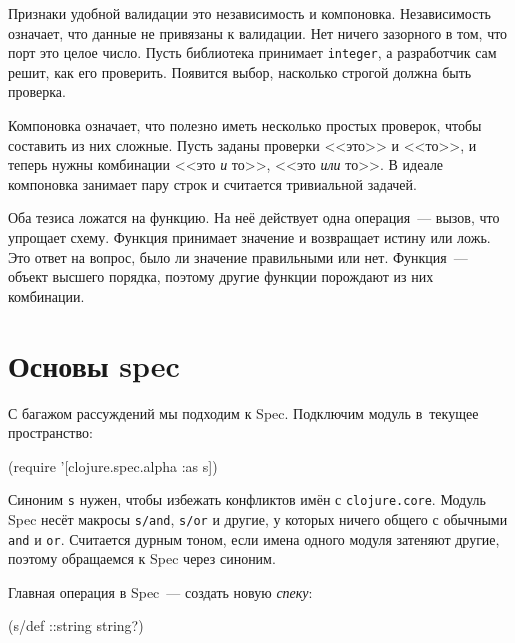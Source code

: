 
Признаки удобной валидации это независимость и компоновка. Независимость
означает, что данные не привязаны к валидации. Нет ничего зазорного в том, что
порт это целое число. Пусть библиотека принимает \verb|integer|, а разработчик
сам решит, как его проверить. Появится выбор, насколько строгой должна быть
проверка.


Компоновка означает, что полезно иметь несколько простых проверок, чтобы
составить из них сложные. Пусть заданы проверки <<это>> и <<то>>, и теперь нужны
комбинации <<это \emph{и} то>>, <<это \emph{или} то>>. В идеале компоновка
занимает пару строк и считается тривиальной задачей.


Оба тезиса ложатся на функцию. На неё действует одна операция~--- вызов, что
упрощает схему. Функция принимает значение и возвращает истину или ложь. Это
ответ на вопрос, было ли значение правильными или нет. Функция~--- объект
высшего порядка, поэтому другие функции порождают из них комбинации.

\section{Основы spec}

С багажом рассуждений мы подходим к Spec. Подключим модуль в~текущее
пространство:

\begin{english}
  \begin{clojure}
(require '[clojure.spec.alpha :as s])
  \end{clojure}
\end{english}

Синоним \verb|s| нужен, чтобы избежать конфликтов имён с
\verb|clojure.core|. Модуль Spec несёт макросы \verb|s/and|, \verb|s/or| и
другие, у которых ничего общего с обычными \verb|and| и \verb|or|. Считается
дурным тоном, если имена одного модуля затеняют другие, поэтому обращаемся к
Spec через синоним.


Главная операция в Spec~--- создать новую \emph{спеку}:

\begin{english}
  \begin{clojure}
(s/def ::string string?)
  \end{clojure}
\end{english}

